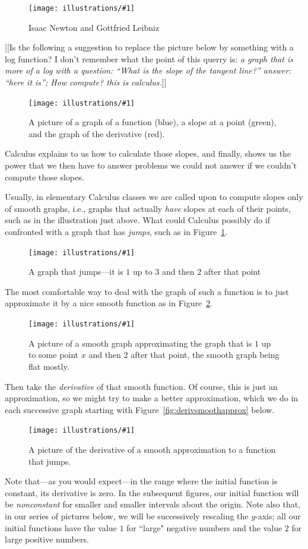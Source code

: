 \documentclass[11pt]{article}
\newcommand{\ill}[3]{ 
   \begin{figure}[H]
   \begin{center}
   \texttt{[image: illustrations/\#1]}
   \caption{#3}
   \end{center}
    \end{figure}
}
\theoremstyle{plain}
\theoremstyle{definition}
\numberwithin{equation}{section}
\numberwithin{figure}{section}
\numberwithin{table}{section}
\begin{document}
\ill{newton-leibniz}{0.5}{Isaac Newton and Gottfried Leibniz}

[[Is the following a suggestion to replace the picture below by something with a log function?  I don't remember what the point of this querry is: {\em a graph that is more of a log with a question: ``What is the slope
of the tangent line?'' answer: ``here it is''; How compute?  this is
calculus.}]] 
   
   
\ill{graph_slope_deriv}{0.6}{A picture of a graph of a function (blue), a slope at a point (green), and the graph of the derivative (red).}
      
\noindent Calculus explains to us how to calculate those slopes, and
finally, shows us the power that we then have to answer problems we
could not answer if we couldn't compute those slopes.


Usually, in elementary Calculus classes we are called upon to compute
slopes only of smooth graphs, i.e., graphs that actually {\em have}
slopes at each of their points, such as in the illustration just
above.  What could Calculus possibly do if confronted with a graph
that has {\em jumps}, such as in Figure~\ref{fig:jump}.
 
\ill{jump}{0.5}{A graph that jumps---it is $1$ up to $3$ and then $2$ after that point\label{fig:jump}}
  
The most comfortable way to deal with the graph of such a function is
to just approximate it by a nice smooth function as in
Figure~\ref{fig:jumpsmooth}.
    
   
\ill{jump-smooth}{0.5}{A picture of a smooth graph approximating the
  graph that is $1$ up to some point $x$ and then $2$ after that
  point, the smooth graph being flat mostly.\label{fig:jumpsmooth}}


Then take the {\em derivative} of that smooth function.  Of course,
this is just an approximation, so we might try to make a better
approximation, which we do in each successive graph starting
with Figure~\ref{fig:derivsmoothapprox} below.


\ill{jump-smooth-deriv-7}{0.6}{A picture of the derivative of
a smooth approximation to a function that jumps.\label{fig:djump1}}

Note that---as you would expect---in the range where the initial
function is constant, its derivative is zero. In the subsequent
figures, our initial function will be {\it nonconstant} for smaller
and smaller intervals about the origin. Note also that, in our series
of pictures below, we will be successively rescaling the $y$-axis; all
our initial functions have the value $1$ for ``large" negative numbers
and the value $2$ for large positive numbers.
\end{document}
